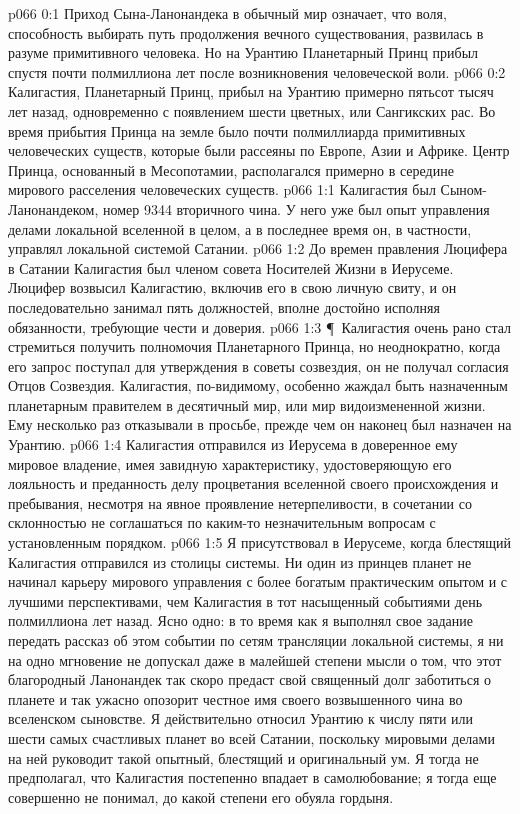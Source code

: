 \author{Мелхиседек}
\vs p066 0:1 Приход Сына\hyp{}Ланонандека в обычный мир означает, что воля, способность выбирать путь продолжения вечного существования, развилась в разуме примитивного человека. Но на Урантию Планетарный Принц прибыл спустя почти полмиллиона лет после возникновения человеческой воли.
\vs p066 0:2 Калигастия, Планетарный Принц, прибыл на Урантию примерно пятьсот тысяч лет назад, одновременно с появлением шести цветных, или Сангикских рас. Во время прибытия Принца на земле было почти полмиллиарда примитивных человеческих существ, которые были рассеяны по Европе, Азии и Африке. Центр Принца, основанный в Месопотамии, располагался примерно в середине мирового расселения человеческих существ.
\vs p066 1:1 Калигастия был Сыном\hyp{}Ланонандеком, номер 9344 вторичного чина. У него уже был опыт управления делами локальной вселенной в целом, а в последнее время он, в частности, управлял локальной системой Сатании.
\vs p066 1:2 До времен правления Люцифера в Сатании Калигастия был членом совета Носителей Жизни в Иерусеме. Люцифер возвысил Калигастию, включив его в свою личную свиту, и он последовательно занимал пять должностей, вполне достойно исполняя обязанности, требующие чести и доверия.
\vs p066 1:3 \P\ Калигастия очень рано стал стремиться получить полномочия Планетарного Принца, но неоднократно, когда его запрос поступал для утверждения в советы созвездия, он не получал согласия Отцов Созвездия. Калигастия, по\hyp{}видимому, особенно жаждал быть назначенным планетарным правителем в десятичный мир, или мир видоизмененной жизни. Ему несколько раз отказывали в просьбе, прежде чем он наконец был назначен на Урантию.
\vs p066 1:4 Калигастия отправился из Иерусема в доверенное ему мировое владение, имея завидную характеристику, удостоверяющую его лояльность и преданность делу процветания вселенной своего происхождения и пребывания, несмотря на явное проявление нетерпеливости, в сочетании со склонностью не соглашаться по каким\hyp{}то незначительным вопросам с установленным порядком.
\vs p066 1:5 Я присутствовал в Иерусеме, когда блестящий Калигастия отправился из столицы системы. Ни один из принцев планет не начинал карьеру мирового управления с более богатым практическим опытом и с лучшими перспективами, чем Калигастия в тот насыщенный событиями день полмиллиона лет назад. Ясно одно: в то время как я выполнял свое задание передать рассказ об этом событии по сетям трансляции локальной системы, я ни на одно мгновение не допускал даже в малейшей степени мысли о том, что этот благородный Ланонандек так скоро предаст свой священный долг заботиться о планете и так ужасно опозорит честное имя своего возвышенного чина во вселенском сыновстве. Я действительно относил Урантию к числу пяти или шести самых счастливых планет во всей Сатании, поскольку мировыми делами на ней руководит такой опытный, блестящий и оригинальный ум. Я тогда не предполагал, что Калигастия постепенно впадает в самолюбование; я тогда еще совершенно не понимал, до какой степени его обуяла гордыня.
